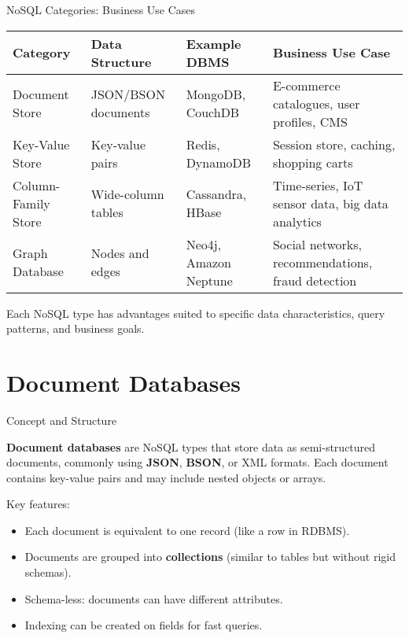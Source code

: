 \documentclass[aspectratio=169, table]{beamer}
\begin{document}
\begin{frame}{NoSQL Categories: Business Use Cases}
	\vspace{20pt}
	
	\begin{table}[h]
		\centering
		\renewcommand{\arraystretch}{1.3}
		\setlength{\tabcolsep}{3pt}
		\footnotesize
		\arrayrulewidth=0.5pt
		
		\begin{tabular}{|p{}|p{}|p{}|p{}|}
			\hline
			\textbf{Category} & \textbf{Data Structure} & \textbf{Example DBMS} & \textbf{Business Use Case} \\ \hline
			Document Store & JSON/BSON documents & MongoDB, CouchDB & E-commerce catalogues, user profiles, CMS \\ \hline
			Key-Value Store & Key-value pairs & Redis, DynamoDB & Session store, caching, shopping carts \\ \hline
			Column-Family Store & Wide-column tables & Cassandra, HBase & Time-series, IoT sensor data, big data analytics \\ \hline
			Graph Database & Nodes and edges & Neo4j, Amazon Neptune & Social networks, recommendations, fraud detection \\ \hline
		\end{tabular}
		
	\end{table}
	
	\vspace{10pt}
	Each NoSQL type has advantages suited to specific data characteristics, query patterns, and business goals.
	
\end{frame}

\section{Document Databases}

\begin{frame}{Concept and Structure}
	\vspace{20pt}
	
	\textbf{Document databases} are NoSQL types that store data as semi-structured documents, commonly using \textbf{JSON}, \textbf{BSON}, or XML formats. Each document contains key-value pairs and may include nested objects or arrays.
	
	\vspace{10pt}
	Key features:
	\begin{itemize}
		\item Each document is equivalent to one record (like a row in RDBMS).
		\item Documents are grouped into \textbf{collections} (similar to tables but without rigid schemas).
		\item Schema-less: documents can have different attributes.
		\item Indexing can be created on fields for fast queries.
	\end{itemize}
	
\end{frame}
\end{document}
